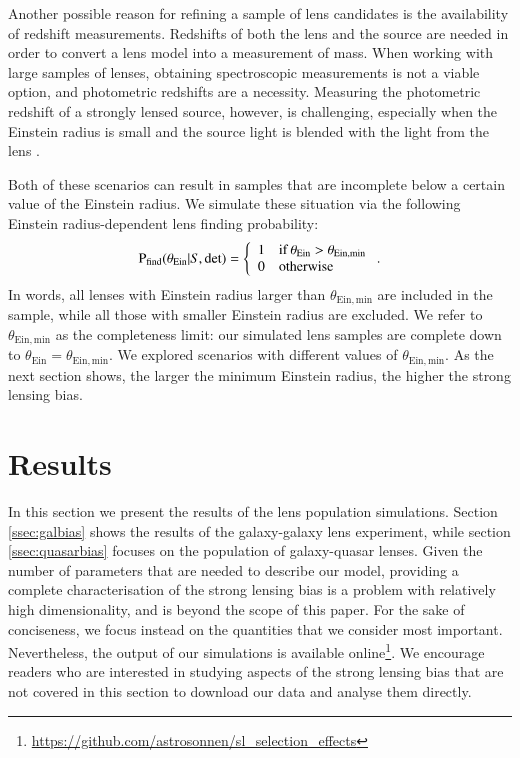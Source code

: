 \documentclass{aa}
\def\tein{\theta_{\mathrm{Ein}}}
\def\teinmin{\theta_{\mathrm{Ein,min}}}
\def\pfind{{\rm P}_\mathrm{find}}
\begin{document}
Another possible reason for refining a sample of lens candidates is the availability of redshift measurements. Redshifts of both the lens and the source are needed in order to convert a lens model into a measurement of mass. When working with large samples of lenses, obtaining spectroscopic measurements is not a viable option, and photometric redshifts are a necessity. Measuring the photometric redshift of a strongly lensed source, however, is challenging, especially when the Einstein radius is small and the source light is blended with the light from the lens \citep{Lan++22}.

Both of these scenarios can result in samples that are incomplete below a certain value of the Einstein radius. %
We simulate these situation via the following Einstein radius-dependent lens finding probability:
\begin{equation}
\pfind(\tein|S,\mathrm{det}) = \left\{\begin{array}{ll} 1 & \rm{if}\,\tein > \teinmin \\
0 & \rm{otherwise}\end{array}\right. .
\end{equation}
In words, all lenses with Einstein radius larger than $\theta_{\mathrm{Ein,min}}$ are included in the sample, while all those with smaller Einstein radius are excluded.
We refer to $\teinmin$ as the completeness limit: our simulated lens samples are complete down to $\tein=\teinmin$.
We explored scenarios with different values of $\teinmin$.
As the next section shows, the larger the minimum Einstein radius, the higher the strong lensing bias.


\section{Results}\label{sect:results}

In this section we present the results of the lens population simulations. 
Section \ref{ssec:galbias} shows the results of the galaxy-galaxy lens experiment, while section \ref{ssec:quasarbias} focuses on the population of galaxy-quasar lenses.
Given the number of parameters that are needed to describe our model, providing a complete characterisation of the strong lensing bias is a problem with relatively high dimensionality, and is beyond the scope of this paper.
For the sake of conciseness, we focus instead on the quantities that we consider most important.
Nevertheless, the output of our simulations is available online\footnote{\url{https://github.com/astrosonnen/sl_selection_effects}}. We encourage readers who are interested in studying aspects of the strong lensing bias that are not covered in this section to download our data and analyse them directly.
\end{document}
